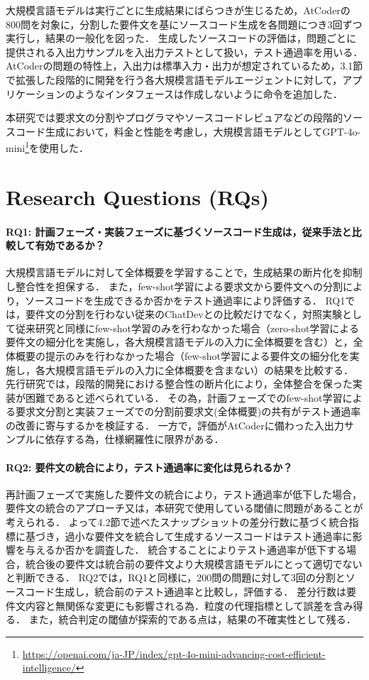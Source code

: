 \documentclass[11pt]{jreport}
\begin{document}
大規模言語モデルは実行ごとに生成結果にばらつきが生じるため，AtCoderの800問を対象に，分割した要件文を基にソースコード生成を各問題につき3回ずつ実行し，結果の一般化を図った．
生成したソースコードの評価は，問題ごとに提供される入出力サンプルを入出力テストとして扱い，テスト通過率を用いる．
AtCoderの問題の特性上，入出力は標準入力・出力が想定されているため，3.1節で拡張した段階的に開発を行う各大規模言語モデルエージェントに対して，アプリケーションのようなインタフェースは作成しないように命令を追加した．

本研究では要求文の分割やプログラマやソースコードレビュアなどの段階的ソースコード生成において，料金と性能を考慮し，大規模言語モデルとしてGPT-4o-mini\footnote{\url{https://openai.com/ja-JP/index/gpt-4o-mini-advancing-cost-efficient-intelligence/}}を使用した．


\section{Research Questions (RQs)}
\paragraph{RQ1: 計画フェーズ・実装フェーズに基づくソースコード生成は，従来手法と比較して有効であるか？}

大規模言語モデルに対して全体概要を学習することで，生成結果の断片化を抑制し整合性を担保する．
また，few-shot学習による要求文から要件文への分割により，ソースコードを生成できるか否かをテスト通過率により評価する．
RQ1では，要件文の分割を行わない従来のChatDevとの比較だけでなく，対照実験として従来研究\cite{TOSEM}と同様にfew-shot学習のみを行わなかった場合（zero-shot学習による要件文の細分化を実施し，各大規模言語モデルの入力に全体概要を含む）と，全体概要の提示のみを行わなかった場合（few-shot学習による要件文の細分化を実施し，各大規模言語モデルの入力に全体概要を含まない）の結果を比較する．
先行研究\cite{TOSEM}では，段階的開発における整合性の断片化により，全体整合を保った実装が困難であると述べられている．
その為，計画フェーズでのfew-shot学習による要求文分割と実装フェーズでの分割前要求文(全体概要)の共有がテスト通過率の改善に寄与するかを検証する．
一方で，評価がAtCoderに備わった入出力サンプルに依存する為，仕様網羅性に限界がある．

\paragraph{RQ2: 要件文の統合により，テスト通過率に変化は見られるか？}
再計画フェーズで実施した要件文の統合により，テスト通過率が低下した場合，要件文の統合のアプローチ又は，本研究で使用している閾値に問題があることが考えられる．
よって4.2節で述べたスナップショットの差分行数に基づく統合指標に基づき，過小な要件文を統合して生成するソースコードはテスト通過率に影響を与えるか否かを調査した．
統合することによりテスト通過率が低下する場合，統合後の要件文は統合前の要件文より大規模言語モデルにとって適切でないと判断できる．
RQ2では，RQ1と同様に，200問の問題に対して3回の分割とソースコード生成し，統合前のテスト通過率と比較し，評価する．
差分行数は要件文内容と無関係な変更にも影響される為．粒度の代理指標として誤差を含み得る．
また，統合判定の閾値が探索的である点は，結果の不確実性として残る．
\end{document}
